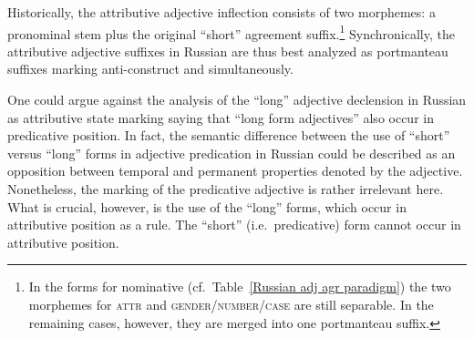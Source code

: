 Historically, the attributive adjective inflection consists of two morphemes: a pronominal stem plus the original “short” agreement suffix.\footnote{In the forms for nominative (cf.~Table~\ref{Russian adj agr paradigm}) the two morphemes for \textsc{attr} and \textsc{gender/number/case} are still separable. In the remaining cases, however, they are merged into one portmanteau suffix.} Synchronically, the attributive adjective suffixes in Russian are thus best analyzed as portmanteau suffixes marking anti\hyp{}construct and  simultaneously.

One could argue against the analysis of the “long” adjective declension in Russian as attributive state marking saying that “long form adjectives” also occur in predicative position. In fact, the semantic difference between the use of “short” versus “long” forms in adjective predication in Russian could be described as an opposition between temporal and permanent properties denoted by the adjective.
Nonetheless, the marking of the predicative adjective is rather irrelevant here. What is crucial, however, is the use of the “long” forms, which occur in attributive position as a rule. The “short” (i.e.~predicative) form cannot occur in attributive position.


